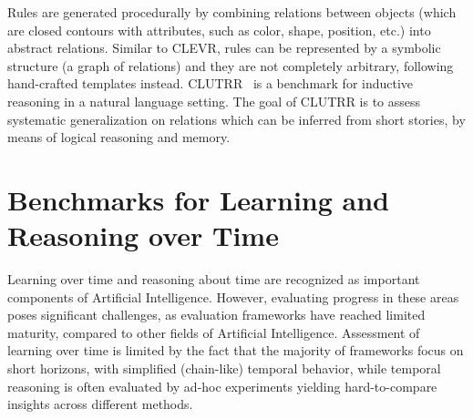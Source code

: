 Rules are generated procedurally by combining relations between objects (which are closed contours with attributes, such as color, shape, position, etc.) into abstract relations.
Similar to CLEVR, rules can be represented by a symbolic structure (a graph of relations) and they are not completely arbitrary, following hand-crafted templates instead.
CLUTRR~\cite{sinha2019clutrr} is a benchmark for inductive reasoning in a natural language setting. The goal of CLUTRR is to assess systematic generalization on relations which can be inferred from short stories, by means of logical reasoning and memory. %

\section{Benchmarks for Learning and Reasoning over Time}
Learning over time and reasoning about time are recognized as important components of Artificial Intelligence. However, evaluating progress in these areas poses significant challenges, as evaluation frameworks have reached limited maturity, compared to other fields of Artificial Intelligence. Assessment of learning over time is limited by the fact that the majority of frameworks focus on short horizons, with simplified (chain-like) temporal behavior, while temporal reasoning is often evaluated by ad-hoc experiments yielding hard-to-compare insights across different methods.

